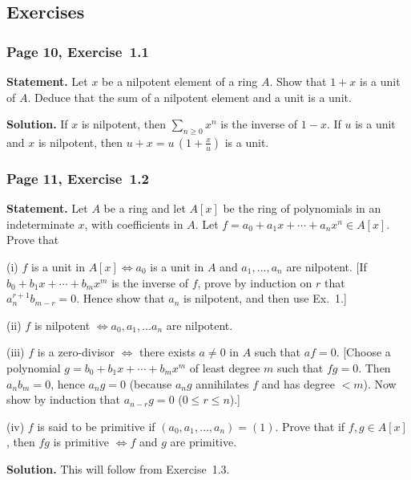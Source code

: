 \documentclass[12pt,letterpaper]{article}%
\newcommand{\mf}{\mathfrak}
\newcommand{\ppp}{\mf p}
\newcommand{\nn}{\noindent}
\begin{document}
\subsection{Exercises}%

\subsubsection{Page 10, Exercise~1.1}%

\textbf{Statement.} Let $x$ be a nilpotent element of a ring $A$. Show that $1+x$ is a unit of $A$. Deduce that the sum of a nilpotent element and a unit is a unit.

\nn\textbf{Solution.} If $x$ is nilpotent, then $\sum_{n\ge0}x^n$ is the inverse of $1-x$. If $u$ is a unit and $x$ is nilpotent, then $u+x=u\,(1+\frac xu)$ is a unit.

\subsubsection{Page 11, Exercise~1.2}\label{ex1.2}%

\textbf{Statement.} Let $A$ be a ring and let $A[x]$ be the ring of polynomials in an indeterminate $x$, with coefficients in $A$. Let $f=a_0+a_1x+\cdots+a_nx^n\in A[x]$. Prove that 

\nn(i) $f$ is a unit in $A[x]\iff a_0$ is a unit in $A$ and $a_1,\ldots,a_n$ are nilpotent. [If $b_0+b_1x+\cdots+b_mx^m$ is the inverse of $f$, prove by induction on $r$ that $a_n^{r+1}b_{m-r}=0$. Hence show that $a_n$ is nilpotent, and then use Ex.~1.]

\nn(ii) $f$ is nilpotent $\iff a_0,a_1,\ldots a_n$ are nilpotent.

\nn(iii) $f$ is a zero-divisor $\iff$ there exists $a\ne0$ in $A$ such that $af=0$. [Choose a polynomial $g=b_0+b_1x+\cdots+b_mx^m$ of least degree $m$ such that $fg=0$. Then $a_nb_m=0$, hence $a_ng=0$ (because $a_ng$ annihilates $f$ and has degree $<m$). Now show by induction that $a_{n-r}g=0$ ($0\le r\le n$).]

\nn(iv) $f$ is said to be primitive if $(a_0,a_1,\ldots,a_n)=(1)$. Prove that if $f,g\in A[x]$, then $fg$ is primitive $\iff f$ and $g$ are primitive.

\nn\textbf{Solution.} 
This will follow from Exercise~1.3. %
\end{document}
